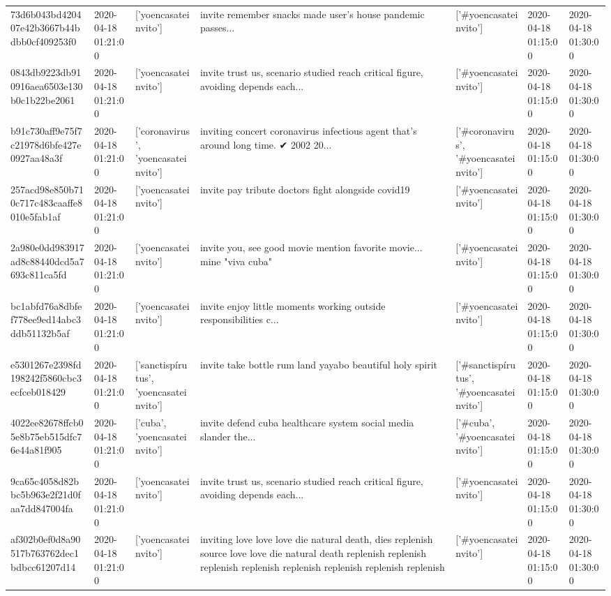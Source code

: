\begin{tabular}{lllllll}
73d6b043bd420407e42b3667b44bdbb0cf409253f0 & 2020-04-18 01:21:00 & ['yoencasateinvito'] & invite remember snacks made user's house pandemic passes... & ['#yoencasateinvito'] & 2020-04-18 01:15:00 & 2020-04-18 01:30:00 \\
0843db9223db910916aea6503e130b0c1b22be2061 & 2020-04-18 01:21:00 & ['yoencasateinvito'] & invite trust us, scenario studied reach critical figure, avoiding depends each... & ['#yoencasateinvito'] & 2020-04-18 01:15:00 & 2020-04-18 01:30:00 \\
b91c730aff9e75f7c21978d6bfe427e0927aa48a3f & 2020-04-18 01:21:00 & ['coronavirus', 'yoencasateinvito'] & inviting concert coronavirus infectious agent that's around long time. ✔ 2002 20... & ['#coronavirus', '#yoencasateinvito'] & 2020-04-18 01:15:00 & 2020-04-18 01:30:00 \\
257acd98e850b710c717c483caaffe8010e5fab1af & 2020-04-18 01:21:00 & ['yoencasateinvito'] & invite pay tribute doctors fight alongside covid19 & ['#yoencasateinvito'] & 2020-04-18 01:15:00 & 2020-04-18 01:30:00 \\
2a980e0dd983917ad8c88440dcd5a7693c811ca5fd & 2020-04-18 01:21:00 & ['yoencasateinvito'] & invite you, see good movie mention favorite movie... mine "viva cuba" & ['#yoencasateinvito'] & 2020-04-18 01:15:00 & 2020-04-18 01:30:00 \\
bc1abfd76a8dbfef778ee9ed14abc3ddb51132b5af & 2020-04-18 01:21:00 & ['yoencasateinvito'] & invite enjoy little moments working outside responsibilities c... & ['#yoencasateinvito'] & 2020-04-18 01:15:00 & 2020-04-18 01:30:00 \\
e5301267e2398fd198242f5860cbc3ecfceb018429 & 2020-04-18 01:21:00 & ['sanctispírutus', 'yoencasateinvito'] & invite take bottle rum land yayabo beautiful holy spirit & ['#sanctispírutus', '#yoencasateinvito'] & 2020-04-18 01:15:00 & 2020-04-18 01:30:00 \\
4022ee82678ffcb05e8b75eb515dfc76e44a81f905 & 2020-04-18 01:21:00 & ['cuba', 'yoencasateinvito'] & invite defend cuba healthcare system social media slander the... & ['#cuba', '#yoencasateinvito'] & 2020-04-18 01:15:00 & 2020-04-18 01:30:00 \\
9ca65c4058d82bbc5b963e2f21d0faa7dd847004fa & 2020-04-18 01:21:00 & ['yoencasateinvito'] & invite trust us, scenario studied reach critical figure, avoiding depends each... & ['#yoencasateinvito'] & 2020-04-18 01:15:00 & 2020-04-18 01:30:00 \\
af302b0ef0d8a90517b763762dec1bdbcc61207d14 & 2020-04-18 01:21:00 & ['yoencasateinvito'] & inviting love love love die natural death, dies replenish source love love die natural death replenish replenish replenish replenish replenish replenish replenish replenish & ['#yoencasateinvito'] & 2020-04-18 01:15:00 & 2020-04-18 01:30:00 \\

\end{tabular}
